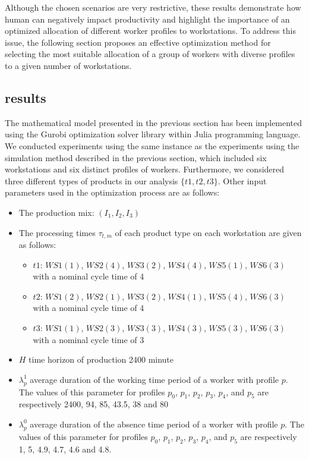 \documentclass[review,12pt, 3p, times]{elsarticle}
\begin{document}
Although the chosen scenarios are very restrictive, these results demonstrate how human  can negatively impact productivity and highlight the importance of an optimized allocation of different worker profiles to workstations. To address this issue, the following section proposes an effective optimization method for selecting the most suitable allocation of a group of workers with diverse  profiles to a given number of workstations.

\subsection{ results}
The mathematical model presented in the previous section has been implemented using the  Gurobi optimization solver library within Julia programming language. 
We conducted experiments using the same instance as the experiments using the simulation method described in the previous section, which included six workstations and six distinct  profiles of workers. Furthermore, we considered three different types of products in our analysis $\{t1, t2, t3\}$.
Other input parameters used in the optimization process are as follows: 
\begin{itemize}
    \item The production mix: $(I_1, I_2, I_3)$
    \item  The processing times $\tau_{t,m}$ of each product type on each workstation are given as follows: 
        \begin{itemize}
            \item $t1$: $\textit{WS}1(1)$, $\textit{WS}2(4)$, $\textit{WS}3(2)$, $\textit{WS}4(4)$, $\textit{WS}5(1)$, $\textit{WS}6(3)$ with a nominal cycle time of 4
            \item $t2$: $\textit{WS}1(2)$, $\textit{WS}2(1)$, $\textit{WS}3(2)$, $\textit{WS}4(1)$, $\textit{WS}5(4)$, $\textit{WS}6(3)$ with a nominal cycle time of 4
            \item $t3$: $\textit{WS}1(1)$, $\textit{WS}2(3)$, $\textit{WS}3(3)$, $\textit{WS}4(3)$, $\textit{WS}5(3)$, $\textit{WS}6(3)$ with a nominal cycle time of 3
        \end{itemize}
    \item $H$   time horizon of production  2400 minute   
    \item$\lambda^1_p$ average duration of the working time period of a worker with profile $p$. The values of this parameter for profiles $p_0$, $p_1$, $p_2$, $p_3$, $p_4$, and $p_5$  are respectively 2400, 94, 85,  43.5, 38 and 80	
    \item $\lambda^0_p$ average duration of the absence time period of a worker with profile $p$. The values of this parameter for profiles $p_0$, $p_1$, $p_2$, $p_3$, $p_4$, and $p_5$  are respectively 1, 5, 4.9, 4.7, 4.6 and 4.8.      
\end{itemize}
\end{document}
